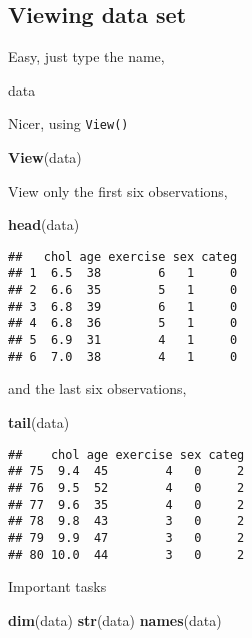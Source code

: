 \documentclass[]{book}
\newenvironment{Shaded}{\begin{snugshade}}{\end{snugshade}}
\newcommand{\KeywordTok}[1]{\textcolor[rgb]{0.13,0.29,0.53}{\textbf{{#1}}}}
\newcommand{\NormalTok}[1]{{#1}}
\theoremstyle{definition}
\theoremstyle{definition}
\theoremstyle{remark}
\begin{document}
\subsection{Viewing data set}\label{viewing-data-set}

Easy, just type the name,

\begin{Shaded}
\begin{Highlighting}[]
\NormalTok{data}
\end{Highlighting}
\end{Shaded}

Nicer, using \texttt{View()}

\begin{Shaded}
\begin{Highlighting}[]
\KeywordTok{View}\NormalTok{(data)}
\end{Highlighting}
\end{Shaded}

View only the first six observations,

\begin{Shaded}
\begin{Highlighting}[]
\KeywordTok{head}\NormalTok{(data)}
\end{Highlighting}
\end{Shaded}

\begin{verbatim}
##   chol age exercise sex categ
## 1  6.5  38        6   1     0
## 2  6.6  35        5   1     0
## 3  6.8  39        6   1     0
## 4  6.8  36        5   1     0
## 5  6.9  31        4   1     0
## 6  7.0  38        4   1     0
\end{verbatim}

and the last six observations,

\begin{Shaded}
\begin{Highlighting}[]
\KeywordTok{tail}\NormalTok{(data)}
\end{Highlighting}
\end{Shaded}

\begin{verbatim}
##    chol age exercise sex categ
## 75  9.4  45        4   0     2
## 76  9.5  52        4   0     2
## 77  9.6  35        4   0     2
## 78  9.8  43        3   0     2
## 79  9.9  47        3   0     2
## 80 10.0  44        3   0     2
\end{verbatim}

Important tasks

\begin{Shaded}
\begin{Highlighting}[]
\KeywordTok{dim}\NormalTok{(data)}
\KeywordTok{str}\NormalTok{(data)}
\KeywordTok{names}\NormalTok{(data)}
\end{Highlighting}
\end{Shaded}
\end{document}
